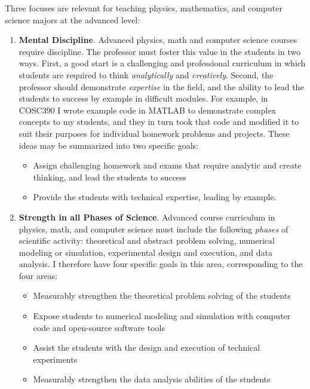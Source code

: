 \documentclass[../../main.tex]{subfiles}
\begin{document}
Three focuses are relevant for teaching physics, mathematics, and computer science majors at the advanced level:
\begin{enumerate}
\item \textbf{Mental Discipline}.  Advanced physics, math and computer science courses require discipline.  The professor must foster this value in the students in two ways.  First, a good start is a challenging and professional curriculum in which students are required to think \textit{analytically} and \textit{creatively}.  Second, the professor should demonstrate \textit{expertise} in the field, and the ability to lead the students to success by example in difficult modules.  For example, in COSC390 I wrote example code in MATLAB to demonstrate complex concepts to my students, and they in turn took that code and modified it to suit their purposes for individual homework problems and projects. These ideas may be summarized into two specific goals:

\begin{itemize}
\item Assign challenging homework and exams that require analytic and create thinking, and lead the students to success %
\item Provide the students with technical expertise, leading by example. %
\end{itemize}

\item \textbf{Strength in all Phases of Science}. Advanced course curriculum in physics, math, and computer science must include the following \textit{phases} of scientific activity: theoretical and abstract problem solving, numerical modeling or simulation, experimental design and execution, and data analysis. I therefore have four specific goals in this area, corresponding to the four areas:

\begin{itemize}
\item Measurably strengthen the theoretical problem solving of the students
\item Expose students to numerical modeling and simulation with computer code and open-source software tools
\item Assist the students with the design and execution of technical experiments
\item Measurably strengthen the data analysis abilities of the students
\end{itemize}


\end{enumerate}
\end{document}
